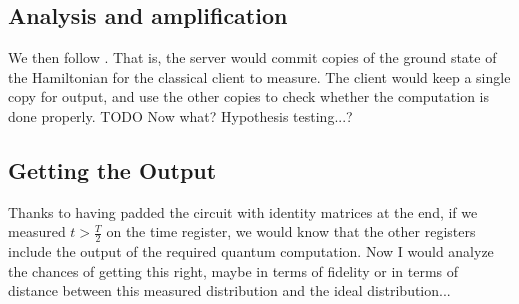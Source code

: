 \subsection{Analysis and amplification}

We then follow \cite{mahadev_delegation}. That is, the server would commit copies of the ground state of the Hamiltonian for the classical client to measure.
The client would keep a single copy for output, and use the other copies to check whether the computation is done properly.
TODO Now what? Hypothesis testing...?

\subsection{Getting the Output}

Thanks to having padded the circuit with identity matrices at the end, if we measured $t>\frac{T}{2}$ on the time register, we would know that the other registers include the output of the required quantum computation. Now I would analyze the chances of getting this right, maybe in terms of fidelity or in terms of distance between this measured distribution and the ideal distribution...

